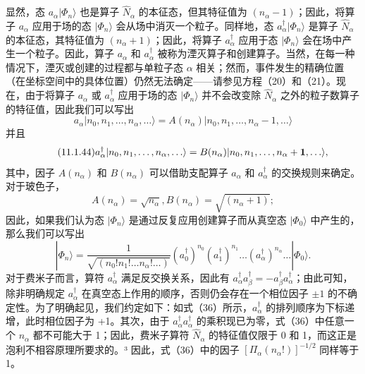 显然，态 \(a_{\alpha}|\Phi_{n}\rangle\) 也是算子 \(\hat{N}_{\alpha}\) 的本征态，但其特征值为 \((n_{\alpha}-1)\)；因此，将算子 \(a_{\alpha}\) 应用于场的态 \(|\Phi_{n}\rangle\) 会从场中消灭一个粒子。同样地，态 \(a_{\alpha}^{\dagger}|\Phi_{n}\rangle\) 是算子 \(\hat{N}_{\alpha}\) 的本征态，其特征值为 \((n_{\alpha}+1)\)；因此，将算子 \(a_{\alpha}^{\dagger}\) 应用于态 \(|\Phi_{n}\rangle\) 会在场中产生一个粒子。因此，算子 \(a_{\alpha}\) 和 \(a_{\alpha}^{\dagger}\) 被称为湮灭算子和创建算子。当然，在每一种情况下，湮灭或创建的过程都与单粒子态 \(\alpha\) 相关；然而，事件发生的精确位置（在坐标空间中的具体位置）仍然无法确定——请参见方程（20）和（21）。现在，由于将算子 \(a_{\alpha}\) 或 \(a_{\alpha}^{\dagger}\) 应用于场的态 \(|\Phi_{n}\rangle\) 并不会改变除 \(\hat{N}_{\alpha}\) 之外的粒子数算子的特征值，因此我们可以写出
\begin{equation}\tag{11.1.43}\label{eq:11.1.43}
a _ { \alpha } | n _ { 0 } , n _ { 1 } , \ldots , n _ { \alpha } , \ldots \rangle = A ( n _ { \alpha } ) | n _ { 0 } , n _ { 1 } , \ldots , n _ { \alpha } - 1 , \ldots \rangle
\end{equation}
并且
\begin{equation}\tag{11.1.44}\label{eq:11.1.44}
a _ { \alpha } ^{\dagger} | n _ { 0 } , n _ { 1 } , \ldots , n _ { \alpha } , \ldots \rangle = B ( n _ { \alpha } ) | n _ { 0 } , n _ { 1 } , \ldots , n _ { \alpha } + { \bf 1 } , \ldots \rangle ,
\end{equation}
其中，因子 \(A(n_{\alpha})\) 和 \(B(n_{\alpha})\) 可以借助支配算子 \(a_{\alpha}\) 和 \(a_{\alpha}^{\dagger}\) 的交换规则来确定。对于玻色子，
\begin{equation}\tag{11.1.45}\label{eq:11.1.45}
A ( n _ { \alpha } ) = \sqrt { n _ { \alpha } } ,  B ( n _ { \alpha } ) = \sqrt { ( n _ { \alpha } + 1 ) } ;
\end{equation}
因此，如果我们认为态 \(|\Phi_{n}\rangle\) 是通过反复应用创建算子而从真空态 \(|\Phi_{0}\rangle\) 中产生的，那么我们可以写出
\begin{equation}\tag{11.1.46}\label{eq:11.1.46}
| \Phi _ { n } \rangle = \frac { 1 } { \sqrt { ( n _ { 0 } ! n _ { 1 } ! \ldots n _ { \alpha } ! \ldots ) } } ( a _ { 0 } ^{\dagger} ) ^{n _ { 0} } ( a _ { 1 } ^{\dagger} ) ^{n _ { 1} } \ldots ( a _ { \alpha } ^{\dagger} ) ^{n _ { \alpha} } \ldots | \Phi _ { 0 } \rangle .
\end{equation}
对于费米子而言，算符 \(a_{\alpha}^{\dagger}\) 满足反交换关系，因此有 \(a_{\alpha}^{\dagger}a_{\beta}^{\dagger}=-a_{\beta}^{\dagger}a_{\alpha}^{\dagger}\)；由此可知，除非明确规定 \(a_{\alpha}^{\dagger}\) 在真空态上作用的顺序，否则仍会存在一个相位因子 \(\pm1\) 的不确定性。为了明确起见，我们约定如下：如式（36）所示，\(a_{\alpha}^{\dagger}\) 的排列顺序为下标递增，此时相位因子为 +1。其次，由于 \(a_{\alpha}^{\dagger}a_{\alpha}^{\dagger}\) 的乘积现已为零，式（36）中任意一个 \(n_{\alpha}\) 都不可能大于 1；因此，费米子算符 \(\hat{N}_{\alpha}\) 的特征值仅限于 0 和 1，而这正是泡利不相容原理所要求的。³ 因此，式（36）中的因子 \([\Pi_{\alpha}(n_{\alpha}!)]^{-1/2}\) 同样等于 1。
